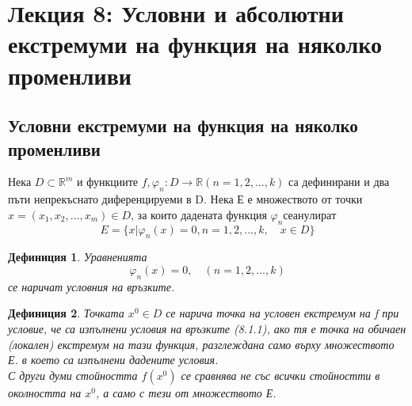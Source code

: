 \documentclass[a4paper,fleqn,12pt]{article}
\newtheorem{definition}{Дефиниция}[subsection]
\theoremstyle{definition}
\begin{document}
\newpage
\section{Лекция 8: Условни и абсолютни екстремуми на функция на няколко променливи}

\subsection{Условни екстремуми на функция на няколко променливи}
Нека $D \subset \mathbb{R}^m$ и функциите $f, \varphi_n : D \to \mathbb{R}(n = 1,2, ..., k)$ са дефинирани и два пъти непрекъснато диференцируеми в D. Нека Е е множеството от точки $x = (x_1, x_2, ..., x_m) \in D$, за които дадената функция $ \varphi_n се анулират$
$$E = \{ x \vert  \varphi_n(x) = 0, n = 1, 2, ..., k, \quad x \in D \}$$

\begin{definition}
Уравненията
$$\varphi_n(x) = 0, \quad (n = 1, 2, ..., k)$$
се наричат условния на връзките. 
\end{definition}

\begin{definition}
Точката $x^0 \in D$ се нарича точка на условен екстремум на f при условие, че са изпълнени условия на връзките (8.1.1), ако тя е точка на обичаен (локален) екстремум на тази функция, разглеждана само върху множеството Е. в което са изпълнени дадените условия. \\
С други думи стойността $f(x^0)$ се сравнява не със всички стойностти в околността на $x^0$, а само с тези от множеството Е. 
\end{definition}
\end{document}
